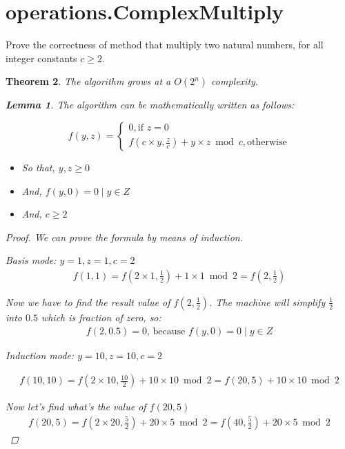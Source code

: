 \documentclass{article}
\newtheorem{theorem}{Theorem}
\newtheorem{lemma}[theorem]{Lemma}
\begin{document}
\section{operations.ComplexMultiply}

Prove the correctness of method that multiply two natural numbers, for all integer constants $c \geq 2$.

\begin{theorem}
The algorithm grows at a $O(2^n)$ complexity.

\begin{lemma}
The algorithm can be mathematically written as follows:

\[
    f(y,z) =
    \begin{cases}
        0, \text{if } z = 0\\
        f(c \times y, \frac{z}{c}) + y \times  z \bmod{c}, \text{otherwise}
    \end{cases}
\]

\begin{itemize}
  \item So that, $y, z \geq 0$
  \item And, $f(y, 0) = 0 \mid y \in Z$
  \item And, $c \geq 2$
\end{itemize}

\begin{proof}

We can prove the formula by means of induction.

Basis mode: $y = 1, z = 1, c = 2$
\begin{align*}
    f(1, 1) = f(2 \times 1, \frac{1}{2}) + 1 \times 1 \bmod{2} = f(2, \frac{1}{2})
\end{align*}

Now we have to find the result value of $f(2, \frac{1}{2})$. The machine will simplify $\frac{1}{2}$ into $0.5$ which is fraction of zero, so:
\begin{align*}
    f(2, 0.5) = 0 \text{, because } f(y, 0) = 0 \mid y \in Z
\end{align*}

Induction mode: $y = 10, z = 10, c = 2$

\begin{align*}
    f(10, 10) = f(2 \times 10, \frac{10}{2}) + 10 \times 10 \bmod{2} = f(20, 5) + 10 \times 10 \bmod{2}
\end{align*}

Now let's find what's the value of $f(20, 5)$
\begin{align*}
    f(20, 5) = f(2 \times 20, \frac{5}{2}) + 20 \times 5 \bmod{2} = f(40, \frac{5}{2}) + 20 \times 5 \bmod{2}
\end{align*}


\end{proof}
\end{lemma}
\end{theorem}
\end{document}
